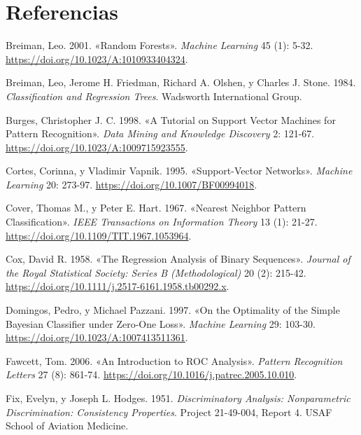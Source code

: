 \documentclass[
  spanish,
  10.5pt,
  letterpaper,
  openany,
  headings=big]{scrbook}
\newlength{\cslhangindent}
\newenvironment{CSLReferences}[2] %
 {\begin{list}{}{%
  \setlength{\itemindent}{0pt}
  \setlength{\leftmargin}{0pt}
  \setlength{\parsep}{0pt}
  \ifodd #1
   \setlength{\leftmargin}{\cslhangindent}
   \setlength{\itemindent}{-1\cslhangindent}
  \fi
  \setlength{\itemsep}{#2\baselineskip}}}
 {\end{list}}
\begin{document}
\chapter*{Referencias}\label{referencias}


\protect{}\label{refs}
\begin{CSLReferences}{1}{1}
Breiman, Leo. 2001. {«Random Forests»}. \emph{Machine Learning} 45 (1):
5-32. \url{https://doi.org/10.1023/A:1010933404324}.

Breiman, Leo, Jerome H. Friedman, Richard A. Olshen, y Charles J. Stone.
1984. \emph{Classification and Regression Trees}. Wadsworth
International Group.

Burges, Christopher J. C. 1998. {«A Tutorial on Support Vector Machines
for Pattern Recognition»}. \emph{Data Mining and Knowledge Discovery} 2:
121-67. \url{https://doi.org/10.1023/A:1009715923555}.

Cortes, Corinna, y Vladimir Vapnik. 1995. {«Support-Vector Networks»}.
\emph{Machine Learning} 20: 273-97.
\url{https://doi.org/10.1007/BF00994018}.

Cover, Thomas M., y Peter E. Hart. 1967. {«Nearest Neighbor Pattern
Classification»}. \emph{IEEE Transactions on Information Theory} 13 (1):
21-27. \url{https://doi.org/10.1109/TIT.1967.1053964}.

Cox, David R. 1958. {«The Regression Analysis of Binary Sequences»}.
\emph{Journal of the Royal Statistical Society: Series B
(Methodological)} 20 (2): 215-42.
\url{https://doi.org/10.1111/j.2517-6161.1958.tb00292.x}.

Domingos, Pedro, y Michael Pazzani. 1997. {«On the Optimality of the
Simple Bayesian Classifier under Zero-One Loss»}. \emph{Machine
Learning} 29: 103-30. \url{https://doi.org/10.1023/A:1007413511361}.

Fawcett, Tom. 2006. {«An Introduction to ROC Analysis»}. \emph{Pattern
Recognition Letters} 27 (8): 861-74.
\url{https://doi.org/10.1016/j.patrec.2005.10.010}.

Fix, Evelyn, y Joseph L. Hodges. 1951. \emph{Discriminatory Analysis:
Nonparametric Discrimination: Consistency Properties}. Project
21-49-004, Report 4. USAF School of Aviation Medicine.


\end{CSLReferences}
\end{document}
